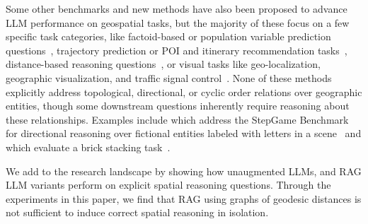 Some other benchmarks and new methods have also been proposed to advance LLM performance on geospatial tasks, but the majority of these focus on a few specific task categories, like
factoid-based or population variable prediction questions~\cite{Qi2023,Roberts2023,Gupta2024,Yan2024,Manvi2024,Lietard2021}, 
trajectory prediction or POI and itinerary recommendation tasks~\cite{Schneider2025,Yu2025,Roberts2023,Xie2024,Gundawar2024,De2024,Sharma2023}, 
distance-based reasoning questions~\cite{Bhandari2023,Osullivan2024,Schneider2024b}, 
or visual tasks like geo-localization, geographic visualization, and traffic signal control~\cite{Feng2024b,Chen2024}.
None of these methods explicitly address topological, directional, or cyclic order relations over geographic entities, though some downstream questions inherently require reasoning about these relationships.
Examples include \citeauthor{Li2024} which address the StepGame Benchmark for directional reasoning over fictional entities labeled with letters in a scene~\cite{Li2024} and \citeauthor{Majic2024} which evaluate a brick stacking task~\cite{Majic2024}.

We add to the research landscape by showing how unaugmented LLMs, and RAG LLM variants perform on explicit spatial reasoning questions. 
Through the experiments in this paper, we find that RAG using graphs of geodesic distances is not sufficient to induce correct spatial reasoning in isolation.
 
